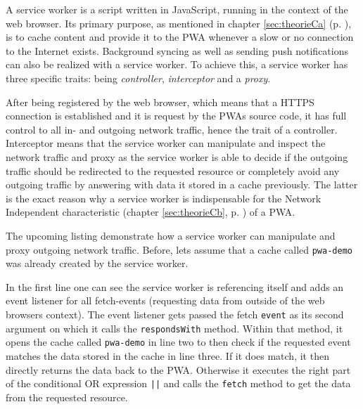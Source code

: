 A service worker is a script written in JavaScript, running in the context of the web browser. Its primary purpose, as mentioned in chapter \ref{sec:theorieCa} (p. \pageref{sec:theorieCa}), is to cache content and provide it to the PWA whenever a slow or no connection to the Internet exists. Background syncing as well as sending push notifications can also be realized with a service worker. To achieve this, a service worker has three specific traits: being \textit{controller}, \textit{interceptor} and a \textit{proxy}. \cite[p. 176]{liebelProgressiveWebApps2019}

After being registered by the web browser, which means that a HTTPS connection is established and it is request by the PWAs source code, it has full control to all in- and outgoing network traffic, hence the trait of a controller. Interceptor means that the service worker can manipulate and inspect the network traffic and proxy as the service worker is able to decide if the outgoing traffic should be redirected to the requested resource or completely avoid any outgoing traffic by answering with data it stored in a cache previously. The latter is the exact reason why a service worker is indispensable for the Network Independent characteristic (chapter \ref{sec:theorieCb}, p. \pageref{sec:theorieCb}) of a PWA. \cite[p. 176-177]{liebelProgressiveWebApps2019}

The upcoming listing demonstrate how a service worker can manipulate and proxy outgoing network traffic. Before, lets assume that a cache called \texttt{pwa-demo} was already created by the service worker.

\begin{center}
	\begin{minipage}{\textwidth}
		
	\end{minipage}
\end{center}

In the first line one can see the service worker is referencing itself and adds an event listener for all fetch-events (requesting data from outside of the web browsers context). The event listener gets passed the fetch \texttt{event} as its second argument on which it calls the \texttt{respondsWith} method. Within that method, it opens the cache called \texttt{pwa-demo} in line two to then check if the requested event matches the data stored in the cache in line three. If it does match, it then directly returns the data back to the PWA. Otherwise it executes the right part of the conditional OR expression \texttt{||} and calls the \texttt{fetch} method to get the data from the requested resource. \cite[p. 60]{liebelProgressiveWebApps2019}

